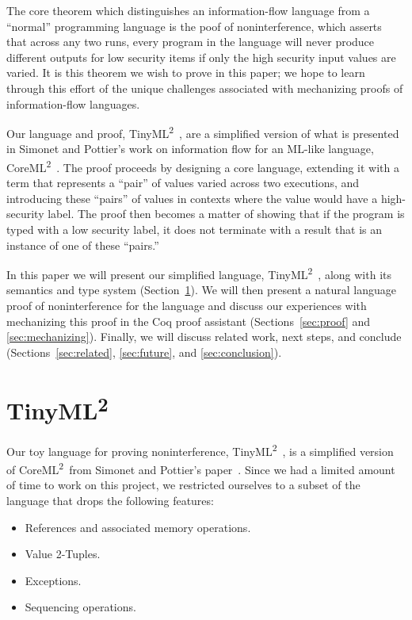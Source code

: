 \documentclass[a4paper,twocolumn]{article}
\newcommand{\langName}[0]{TinyML\textsuperscript{2}~}
\newcommand{\origLang}[0]{CoreML\textsuperscript{2}~}
\theoremstyle{plain}
\theoremstyle{definition}
\begin{document}
The core theorem which distinguishes an information-flow language from a 
``normal'' programming language is the poof of noninterference, 
which asserts that across any two runs, every program in the language will never
produce different outputs for low security items if only the high security input
values are varied.  It is this theorem we wish to prove in this paper; we
hope to learn through this effort of the unique challenges associated with
mechanizing proofs of information-flow languages.

Our language and proof, \langName, are a simplified version of what is
presented in Simonet and Pottier's work on information flow for an ML-like
language, \origLang \cite{InfoFlowML}.  The proof proceeds by designing a
core language, extending it with a term that represents a ``pair'' of 
values varied across two executions, and introducing these ``pairs'' of 
values in contexts where the value would have a high-security label.
The proof then becomes a matter of showing that if
the program is typed with a low security label, it does not terminate
with a result that is an instance of one of these ``pairs.''

In this paper we will present our simplified language, \langName,
along with its semantics and type system (Section~\ref{sec:lang}).  We will then
present a natural language proof of noninterference for the
language and discuss our experiences with mechanizing this proof in the Coq
proof assistant (Sections~\ref{sec:proof} and \ref{sec:mechanizing}).  Finally,
we will discuss related work, next steps, and conclude
(Sections~\ref{sec:related}, \ref{sec:future}, and \ref{sec:conclusion}).

\section{\langName}
\label{sec:lang}

Our toy language for proving noninterference, \langName, is a simplified version
of \origLang from Simonet and Pottier's paper~\cite{InfoFlowML}.  Since we had a
limited amount of time to work on this project, we restricted ourselves to a subset
of the language that drops the following features:

\begin{itemize}
  \item References and associated memory operations.
  \item Value 2-Tuples.
  \item Exceptions.
  \item Sequencing operations.
\end{itemize}
\end{document}
